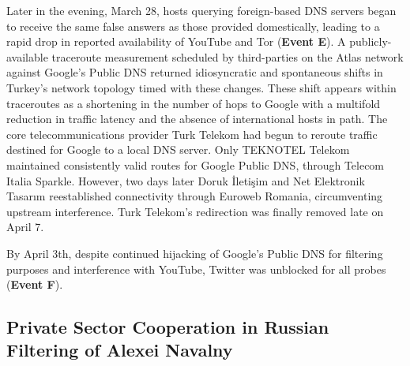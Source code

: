 Later in the evening, March 28, hosts querying foreign-based DNS servers began to
receive the same false answers as those provided domestically, leading to a
rapid drop in reported availability of YouTube and Tor (\textbf{Event E}). A
publicly-available traceroute measurement scheduled by third-parties on the Atlas network 
against Google's Public DNS returned idiosyncratic and
spontaneous shifts in Turkey's network topology timed with these
changes. These shift appears within traceroutes as a shortening in the
number of hops to Google with a multifold reduction in traffic latency and the
absence of international hosts in path. The core telecommunications provider
Turk Telekom had begun to reroute traffic destined for Google to a local DNS
server. Only TEKNOTEL Telekom maintained
consistently valid routes for Google Public DNS, through Telecom Italia
Sparkle. However, two days later Doruk \.{I}leti\c{s}im and Net Elektronik
Tasar{\i}m reestablished connectivity through Euroweb Romania, circumventing upstream interference. Turk Telekom's redirection was finally removed late on April 7.

By April 3th, despite continued hijacking of Google's Public DNS for filtering
purposes and interference with YouTube, Twitter was unblocked for all probes
(\textbf{Event F}).

\subsection{Private Sector Cooperation in Russian Filtering of Alexei Navalny}
\label{sec:russia}


